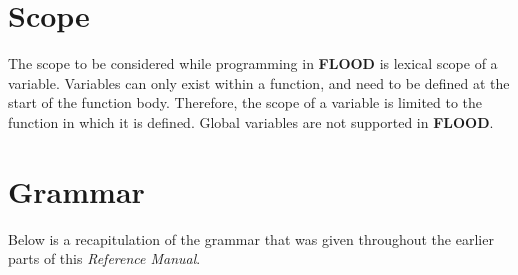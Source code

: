 \documentclass[12pt]{report}
\begin{document}
\section{Scope}

The scope to be considered while programming in \textbf{FLOOD} is lexical scope of a variable. Variables can only exist within a function, and need to be defined at the start of the function body. Therefore, the scope of a variable is limited to the function in which it is defined. Global variables are not supported in \textbf{FLOOD}.

\section{Grammar}

Below is a recapitulation of the grammar that was given throughout the earlier parts of this \textit{Reference Manual}.
\end{document}
